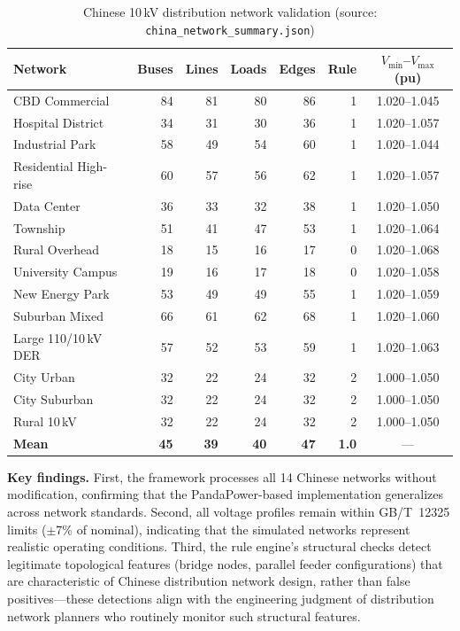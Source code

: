 \documentclass[research]{fcs}
\begin{document}
\begin{table}[htbp]
\centering
\footnotesize
\caption{Chinese 10\,kV distribution network validation (source: \texttt{china\_network\_summary.json})}
\label{tab:china_validation}
\begin{tabular}{@{}lrrrrrc@{}}
\toprule
Network & Buses & Lines & Loads & Edges & Rule & $V_{\min}$--$V_{\max}$ (pu) \\
\midrule
CBD Commercial & 84 & 81 & 80 & 86 & 1 & 1.020--1.045 \\
Hospital District & 34 & 31 & 30 & 36 & 1 & 1.020--1.057 \\
Industrial Park & 58 & 49 & 54 & 60 & 1 & 1.020--1.044 \\
Residential High-rise & 60 & 57 & 56 & 62 & 1 & 1.020--1.057 \\
Data Center & 36 & 33 & 32 & 38 & 1 & 1.020--1.050 \\
Township & 51 & 41 & 47 & 53 & 1 & 1.020--1.064 \\
Rural Overhead & 18 & 15 & 16 & 17 & 0 & 1.020--1.068 \\
University Campus & 19 & 16 & 17 & 18 & 0 & 1.020--1.058 \\
New Energy Park & 53 & 49 & 49 & 55 & 1 & 1.020--1.059 \\
Suburban Mixed & 66 & 61 & 62 & 68 & 1 & 1.020--1.060 \\
Large 110/10\,kV DER & 57 & 52 & 53 & 59 & 1 & 1.020--1.063 \\
City Urban & 32 & 22 & 24 & 32 & 2 & 1.000--1.050 \\
City Suburban & 32 & 22 & 24 & 32 & 2 & 1.000--1.050 \\
Rural 10\,kV & 32 & 22 & 24 & 32 & 2 & 1.000--1.050 \\
\midrule
\textbf{Mean} & \textbf{45} & \textbf{39} & \textbf{40} & \textbf{47} & \textbf{1.0} & --- \\
\bottomrule
\end{tabular}
\end{table}

\textbf{Key findings.} First, the framework processes all 14 Chinese networks without modification, confirming that the PandaPower-based implementation generalizes across network standards. Second, all voltage profiles remain within GB/T~12325 limits ($\pm$7\% of nominal), indicating that the simulated networks represent realistic operating conditions. Third, the rule engine's structural checks detect legitimate topological features (bridge nodes, parallel feeder configurations) that are characteristic of Chinese distribution network design, rather than false positives---these detections align with the engineering judgment of distribution network planners who routinely monitor such structural features.
\end{document}
